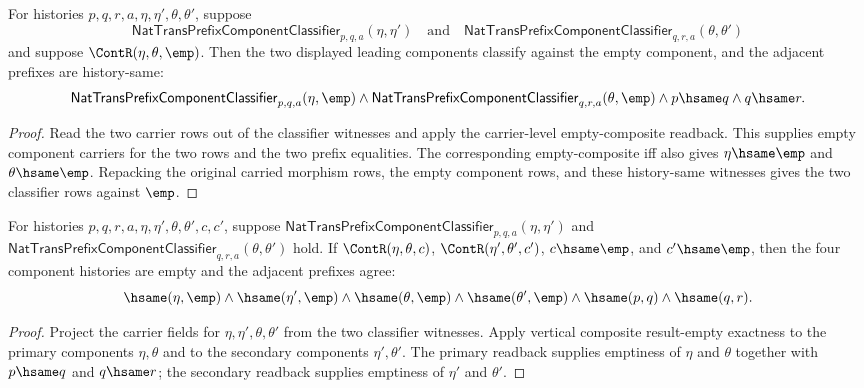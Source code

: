 \begin{theorem}
\label{thm:nattrans-prefix-component-classifier-vert-comp-empty-result-readback}
For histories $p,q,r,a,\eta,\eta',\theta,\theta'$, suppose
$$
\mathsf{NatTransPrefixComponentClassifier}_{p,q,a}(\eta,\eta')
\quad\text{and}\quad
\mathsf{NatTransPrefixComponentClassifier}_{q,r,a}(\theta,\theta')
$$
and suppose $\ContR(\eta,\theta,\emp)$. Then the two displayed leading
components classify against the empty component, and the adjacent prefixes
are history-same:
$$
\mathsf{NatTransPrefixComponentClassifier}_{p,q,a}(\eta,\emp)
\land
\mathsf{NatTransPrefixComponentClassifier}_{q,r,a}(\theta,\emp)
\land p\hsame q\land q\hsame r.
$$
\end{theorem}
\begin{proof}
Read the two carrier rows out of the classifier witnesses and apply the
carrier-level empty-composite readback. This supplies empty component carriers
for the two rows and the two prefix equalities. The corresponding
empty-composite iff also gives $\eta\hsame\emp$ and $\theta\hsame\emp$.
Repacking the original carried morphism rows, the empty component rows, and
these history-same witnesses gives the two classifier rows against $\emp$.
\end{proof}

\begin{theorem}
\label{thm:nattrans-prefix-component-classifier-vert-comp-empty-result-components}
For histories $p,q,r,a,\eta,\eta',\theta,\theta',c,c'$, suppose
$\mathsf{NatTransPrefixComponentClassifier}_{p,q,a}(\eta,\eta')$ and
$\mathsf{NatTransPrefixComponentClassifier}_{q,r,a}(\theta,\theta')$ hold.
If $\ContR(\eta,\theta,c)$, $\ContR(\eta',\theta',c')$,
$c\hsame\emp$, and $c'\hsame\emp$, then the four component histories are
empty and the adjacent prefixes agree:
$$
\hsame(\eta,\emp)\wedge\hsame(\eta',\emp)\wedge
\hsame(\theta,\emp)\wedge\hsame(\theta',\emp)\wedge
\hsame(p,q)\wedge\hsame(q,r).
$$
\end{theorem}
\begin{proof}
Project the carrier fields for $\eta,\eta',\theta,\theta'$ from the two
classifier witnesses. Apply vertical composite result-empty exactness to the
primary components $\eta,\theta$ and to the secondary components
$\eta',\theta'$. The primary readback supplies emptiness of $\eta$ and
$\theta$ together with $p\hsame q$ and $q\hsame r$; the secondary readback
supplies emptiness of $\eta'$ and $\theta'$.
\end{proof}


